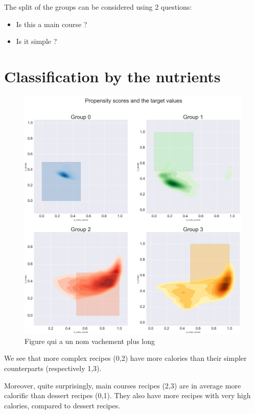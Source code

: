 \documentclass[11pt]{article}
\begin{document}
The split of the groups can be considered using 2 questions:
\begin{itemize}
	\item Is this a main course ?
	\item Is it simple ?
\end{itemize}

\section{Classification by the nutrients}

\begin{figure}[!h]
	\includegraphics[width=\columnwidth]{../propensity-r.png}
	\caption{Figure qui a un nom vachement plus long}
	\label{fig:1}
\end{figure}

We see that more complex recipes (0,2) have more calories than their simpler counterparts (respectively 1,3).

Moreover, quite surprisingly, main courses recipes (2,3) are in average more calorific than dessert recipes (0,1). They also have more recipes with very high calories, compared to dessert recipes.
\end{document}
